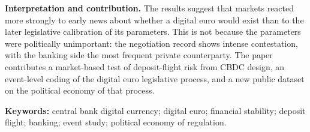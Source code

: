 \documentclass[11pt]{article}
\begin{document}
\textbf{Interpretation and contribution.} The results suggest that markets reacted more strongly to early news about whether a digital euro would exist than to the later legislative calibration of its parameters. This is not because the parameters were politically unimportant: the negotiation record shows intense contestation, with the banking side the most frequent private counterparty. The paper contributes a market-based test of deposit-flight risk from CBDC design, an event-level coding of the digital euro legislative process, and a new public dataset on the political economy of that process.

\textbf{Keywords:} central bank digital currency; digital euro; financial stability; deposit flight; banking; event study; political economy of regulation.
\end{document}
